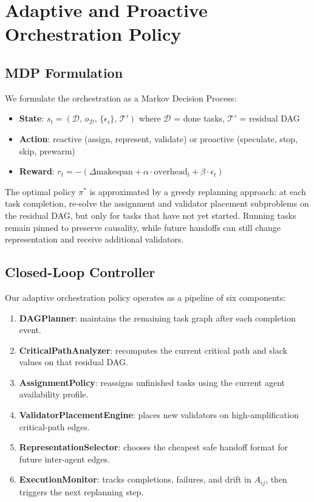 \documentclass[10pt, twocolumn]{article}
\begin{document}
\section{Adaptive and Proactive Orchestration Policy}
\label{sec:policy}

\subsection{MDP Formulation}

We formulate the orchestration as a Markov Decision Process:
\begin{itemize}
    \item \textbf{State}: $s_t = (\mathcal{D},\, o_{\mathcal{D}},\, \{\epsilon_i\},\, \mathcal{T}')$ where $\mathcal{D}$ = done tasks, $\mathcal{T}'$ = residual DAG
    \item \textbf{Action}: reactive (assign, represent, validate) or proactive (speculate, stop, skip, prewarm)
    \item \textbf{Reward}: $r_t = -(\Delta\text{makespan} + \alpha \cdot \text{overhead}_t + \beta \cdot \epsilon_t)$
\end{itemize}

The optimal policy $\pi^*$ is approximated by a greedy replanning approach: at each task completion, re-solve the assignment and validator placement subproblems on the residual DAG, but only for tasks that have not yet started. Running tasks remain pinned to preserve causality, while future handoffs can still change representation and receive additional validators.

\subsection{Closed-Loop Controller}

Our adaptive orchestration policy operates as a pipeline of six components:

\begin{enumerate}
    \item \textbf{DAGPlanner}: maintains the remaining task graph after each completion event.
    \item \textbf{CriticalPathAnalyzer}: recomputes the current critical path and slack values on that residual DAG.
    \item \textbf{AssignmentPolicy}: reassigns unfinished tasks using the current agent availability profile.
    \item \textbf{ValidatorPlacementEngine}: places new validators on high-amplification critical-path edges.
    \item \textbf{RepresentationSelector}: chooses the cheapest safe handoff format for future inter-agent edges.
    \item \textbf{ExecutionMonitor}: tracks completions, failures, and drift in $A_{ij}$, then triggers the next replanning step.
\end{enumerate}
\end{document}

